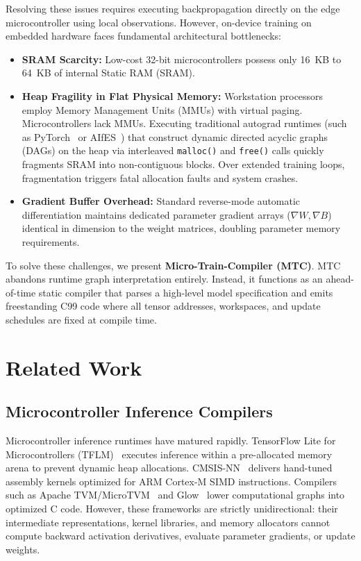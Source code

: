 \documentclass[conference]{IEEEtran}
\begin{document}
Resolving these issues requires executing backpropagation directly on the edge microcontroller using local observations. However, on-device training on embedded hardware faces fundamental architectural bottlenecks:
\begin{itemize}
    \item \textbf{SRAM Scarcity:} Low-cost 32-bit microcontrollers possess only 16~KB to 64~KB of internal Static RAM (SRAM).
    \item \textbf{Heap Fragility in Flat Physical Memory:} Workstation processors employ Memory Management Units (MMUs) with virtual paging. Microcontrollers lack MMUs. Executing traditional autograd runtimes (such as PyTorch~\cite{paszke2019pytorch} or AIfES~\cite{antonacopoulos2021aifes}) that construct dynamic directed acyclic graphs (DAGs) on the heap via interleaved \texttt{malloc()} and \texttt{free()} calls quickly fragments SRAM into non-contiguous blocks. Over extended training loops, fragmentation triggers fatal allocation faults and system crashes.
    \item \textbf{Gradient Buffer Overhead:} Standard reverse-mode automatic differentiation maintains dedicated parameter gradient arrays ($\nabla W, \nabla B$) identical in dimension to the weight matrices, doubling parameter memory requirements.
\end{itemize}

To solve these challenges, we present \textbf{Micro-Train-Compiler (MTC)}. MTC abandons runtime graph interpretation entirely. Instead, it functions as an ahead-of-time static compiler that parses a high-level model specification and emits freestanding C99 code where all tensor addresses, workspaces, and update schedules are fixed at compile time.

\section{Related Work}

\subsection{Microcontroller Inference Compilers}
Microcontroller inference runtimes have matured rapidly. TensorFlow Lite for Microcontrollers (TFLM)~\cite{david2021tensorflow} executes inference within a pre-allocated memory arena to prevent dynamic heap allocations. CMSIS-NN~\cite{lai2018cmsis} delivers hand-tuned assembly kernels optimized for ARM Cortex-M SIMD instructions. Compilers such as Apache TVM/MicroTVM~\cite{chen2018tvm} and Glow~\cite{rotem2018glow} lower computational graphs into optimized C code. However, these frameworks are strictly unidirectional: their intermediate representations, kernel libraries, and memory allocators cannot compute backward activation derivatives, evaluate parameter gradients, or update weights.
\end{document}

